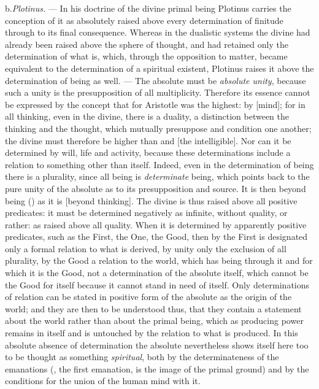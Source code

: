 b.\enspace \emph{Plotinus.} --- In his doctrine of the divine primal being
Plotinus carries the conception of it as absolutely
raised above every determination of finitude through to its final consequence.
Whereas in the dualistic systems the divine had already been raised
above the sphere of thought, and had retained only the determination of
what is, which, through the opposition to matter, became equivalent to
the determination of a spiritual existent, Plotinus raises it above the
determination of being as well. --- The absolute must be \emph{absolute
unity}, because such a unity is the presupposition of all multiplicity.
Therefore its essence cannot be expressed by the concept that for
Aristotle was the highest: by  [mind]; for in all thinking, even in
the divine, there is a duality, a distinction between the thinking and
the thought, which mutually presuppose and condition one another; the
divine must therefore be higher than  and  [the intelligible].
Nor can it be determined by will, life and activity, because these
determinations include a relation to something other than itself.
Indeed, even in the determination of being there is a plurality, since
all being is \emph{determinate} being, which points back to the pure
unity of the absolute as to its presupposition and source. It is then
beyond being () as it is  [beyond thinking].
The divine is thus raised above all positive predicates: it must be
determined negatively as infinite, without quality, or rather: as
raised above all quality. When it is determined by apparently positive
predicates, such as the First, the One, the Good, then by the First is
designated only a formal relation to what is derived, by unity only the
exclusion of all plurality, by the Good a relation to the world, which
has being through it and for which it is the Good, not a determination
of the absolute itself, which cannot be the Good for itself because it
cannot stand in need of itself. Only determinations of relation can be
stated in positive form of the absolute as the origin of the world; and
they are then to be understood thus, that they contain a statement about
the world rather than about the primal being, which as producing power
remains in itself and is untouched by the relation to what is produced.
In this absolute absence of determination the absolute
nevertheless shows itself here too to be thought as something
\emph{spiritual}, both by the determinateness of the emanations
(, the first emanation, is the image of the primal ground) and by
the conditions for the union of the human mind with it.

